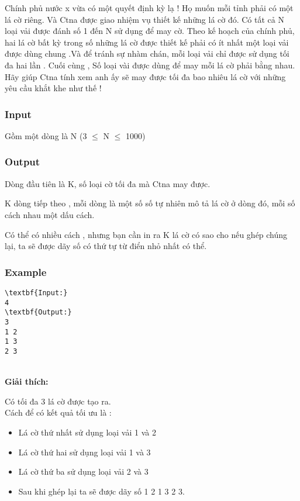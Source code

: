 

Chính phủ nước x vừa có một quyết định kỳ lạ ! Họ muốn mỗi tỉnh phải có một lá cờ riêng. Và Ctna được giao nhiệm vụ thiết kế những lá cờ đó. Có tất cả N loại vải được đánh số 1 đến N sử dụng để may cờ. Theo kế hoạch của chính phủ, hai lá cờ bất kỳ trong số những lá cờ được thiết kế phải có ít nhất một loại vải được dùng chung .Và để tránh sự nhàm chán, mỗi loại vải chỉ được sử dụng tối đa hai lần . Cuối cùng , Số loại vài được dùng để may mỗi lá cờ phải bằng nhau. Hãy giúp Ctna tính xem anh ấy sẽ may được tối đa bao nhiêu lá cờ với những yêu cầu khắt khe như thế !

\subsubsection{Input}

Gồm một dòng là N (3  $\le$  N  $\le$  1000)

\subsubsection{Output}

Dòng đầu tiên là K, số loại cờ tối đa mà Ctna may được.

K dòng tiếp theo , mỗi dòng là một số số tự nhiên mô tả lá cờ ở dòng đó, mỗi số cách nhau một dấu cách.

Có thể có nhiều cách , nhưng bạn cần in ra K lá cờ có sao cho nếu ghép chúng lại, ta sẽ được dãy số có thứ tự từ điển nhỏ nhất có thể.

\subsubsection{Example}
\begin{verbatim}
\textbf{Input:}
4
\textbf{Output:}
3
1 2
1 3
2 3\end{verbatim}


\\\textbf{Giải thích:}

Có tối đa 3 lá cờ được tạo ra.
\\Cách để có kết quả tối ưu là :
\begin{itemize}
	\item Lá cờ thứ nhất sử dụng loại vải 1 và 2
	\item Lá cờ thứ hai sử dụng loại vải 1 và 3
	\item Lá cờ thứ ba sử dụng loại vải 2 và 3
	\item Sau khi ghép lại ta sẽ được dãy số 1 2 1 3 2 3.
\end{itemize}
